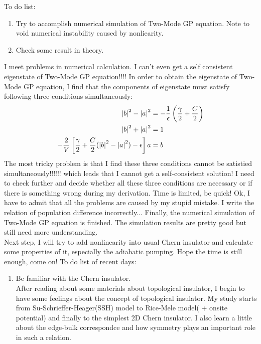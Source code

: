\documentclass[fontsize=11pt, %
                             paper=a4, %
                             twoside, %
                             captions=tableheading,
                             index=totoc,
                             hyperref]{labbook}
\begin{document}
\begin{addmargin}[4cm]{0cm}
To do list:
\begin{enumerate}
\item
Try to accomplish numerical simulation of Two-Mode GP equation. Note to void numerical instability caused by nonliearity.
\item
Check some result in theory.
\end{enumerate}
I meet problems in numerical calculation. I can't even get a self consistent eigenstate of Two-Mode GP equation!!!! In order to obtain the eigenstate of Two-Mode GP equation, I find that the components of eigenstate must satisfy following three conditions simultaneously:
\begin{equation}
\begin{aligned}
\left| b \right|^2-\left| a \right|^2&=-\frac{1}{\epsilon}\left(\frac{\gamma}{2}+\frac{C}{2}\right)\\
\left| b \right|^2+\left| a \right|^2&=1\\
-\frac{2}{V}\left[\frac{\gamma}{2}+\frac{C}{2}(\left| b \right|^2-\left| a \right|^2)-\epsilon\right]a&=b
\end{aligned}
\end{equation}
The most tricky problem is that I find these three conditions cannot be satistied simultaneously!!!!!!  which leads that I cannot get a self-consistent solution! I need to check further and decide whether all these three conditions are necessary or if there is something wrong during my derivation. Time is limited, be quick!
Ok, I have to admit that all the problems are caused by my stupid mistake. I write the relation of population difference incorrectly... Finally, the numerical simulation of Two-Mode GP equation is finished. The simulation results are pretty good but still need more understanding. \\
Next step, I will try to add nonlinearity into usual Chern insulator and calculate some properties of it, especially the adiabatic pumping. Hope the time is still enough, come on!
To do list of recent days:
\begin{enumerate}
\item
Be familiar with the Chern insulator.\\
After reading about some materials about topological insulator, I begin to have some feelings about the concept of topological insulator. My study starts from Su-Schrieffer-Heager(SSH) model to Rice-Mele model( + onsite potential) and finally to the simplest 2D Chern insulator. I also learn a little about the edge-bulk correspondce and how symmetry plays an important role in such a relation.

\end{enumerate}
\end{addmargin}
\end{document}
